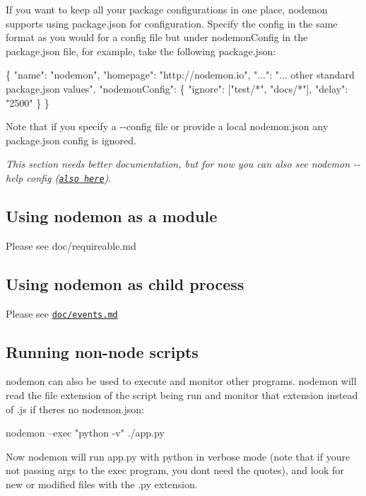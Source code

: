 If you want to keep all your package configurations in one place, nodemon supports using {\ttfamily package.\+json} for configuration. Specify the config in the same format as you would for a config file but under {\ttfamily nodemon\+Config} in the {\ttfamily package.\+json} file, for example, take the following {\ttfamily package.\+json}\+:


\begin{DoxyCode}
\{
  "name": "nodemon",
  "homepage": "http://nodemon.io",
  "...": "... other standard package.json values",
  "nodemonConfig": \{
    "ignore": ["test/*", "docs/*"],
    "delay": "2500"
  \}
\}
\end{DoxyCode}


Note that if you specify a {\ttfamily -\/-\/config} file or provide a local {\ttfamily nodemon.\+json} any {\ttfamily package.\+json} config is ignored.

{\itshape This section needs better documentation, but for now you can also see {\ttfamily nodemon -\/-\/help config} (\href{https://github.com/remy/nodemon/blob/master/doc/cli/config.txt}{\tt also here})}.

\subsection*{Using nodemon as a module}

Please see doc/requireable.md

\subsection*{Using nodemon as child process}

Please see \href{doc/events.md#Using_nodemon_as_child_process}{\tt doc/events.\+md}

\subsection*{Running non-\/node scripts}

nodemon can also be used to execute and monitor other programs. nodemon will read the file extension of the script being run and monitor that extension instead of {\ttfamily .js} if there\textquotesingle{}s no {\ttfamily nodemon.\+json}\+:


\begin{DoxyCode}
nodemon --exec "python -v" ./app.py
\end{DoxyCode}


Now nodemon will run {\ttfamily app.\+py} with python in verbose mode (note that if you\textquotesingle{}re not passing args to the exec program, you don\textquotesingle{}t need the quotes), and look for new or modified files with the {\ttfamily .py} extension.

